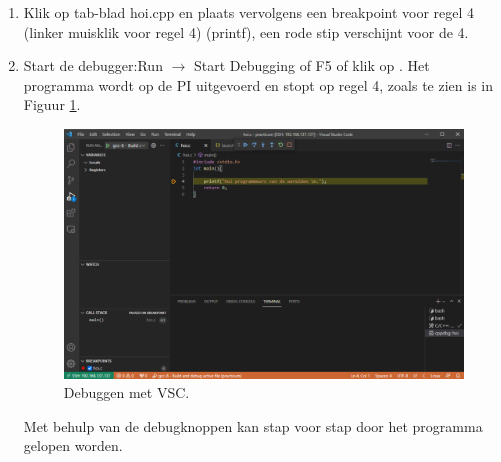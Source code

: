 \begin{enumerate}
\begin{enumerate}
   \item Klik op tab-blad hoi.cpp en plaats vervolgens een breakpoint voor regel 4 (linker muisklik voor regel 4) (printf), een rode stip verschijnt voor de 4. 
   \item Start de debugger:Run $\rightarrow$ Start Debugging of F5 of klik op . Het programma wordt op de PI uitgevoerd en stopt op regel 4, zoals te zien is in Figuur \ref{fig:vscDebugVld}.
 	\begin{figure}[h!]
	\captionsetup{justification=centering}
	\includegraphics[width=0.8 \linewidth]{figuren/VSCdebugVeld}
	\centering
	\caption{Debuggen met VSC.}
	\label{fig:vscDebugVld}
\end{figure}     
   Met behulp van de debugknoppen  kan stap voor stap door het programma gelopen worden.
     \end{enumerate}
     
\end{enumerate}
	
